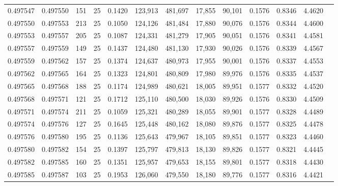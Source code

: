 \begin{tabular}{rrrrrrrrrrrrr}
0.497547 & 0.497550 & 151 &  25 &                                     0.1420 & 123,913 & 481,697 &  17,855 &  90,101 & 0.1576 & 0.8346 & 4.4620 \\
0.497550 & 0.497553 & 213 &  25 &                                     0.1050 & 124,126 & 481,484 &  17,880 &  90,076 & 0.1576 & 0.8344 & 4.4600 \\
0.497553 & 0.497557 & 205 &  25 &                                     0.1087 & 124,331 & 481,279 &  17,905 &  90,051 & 0.1576 & 0.8341 & 4.4581 \\
0.497557 & 0.497559 & 149 &  25 &                                     0.1437 & 124,480 & 481,130 &  17,930 &  90,026 & 0.1576 & 0.8339 & 4.4567 \\
0.497559 & 0.497562 & 157 &  25 &                                     0.1374 & 124,637 & 480,973 &  17,955 &  90,001 & 0.1576 & 0.8337 & 4.4553 \\
0.497562 & 0.497565 & 164 &  25 &                                     0.1323 & 124,801 & 480,809 &  17,980 &  89,976 & 0.1576 & 0.8335 & 4.4537 \\
0.497565 & 0.497568 & 188 &  25 &                                     0.1174 & 124,989 & 480,621 &  18,005 &  89,951 & 0.1577 & 0.8332 & 4.4520 \\
0.497568 & 0.497571 & 121 &  25 &                                     0.1712 & 125,110 & 480,500 &  18,030 &  89,926 & 0.1576 & 0.8330 & 4.4509 \\
0.497571 & 0.497574 & 211 &  25 &                                     0.1059 & 125,321 & 480,289 &  18,055 &  89,901 & 0.1577 & 0.8328 & 4.4489 \\
0.497574 & 0.497576 & 127 &  25 &                                     0.1645 & 125,448 & 480,162 &  18,080 &  89,876 & 0.1577 & 0.8325 & 4.4478 \\
0.497576 & 0.497580 & 195 &  25 &                                     0.1136 & 125,643 & 479,967 &  18,105 &  89,851 & 0.1577 & 0.8323 & 4.4460 \\
0.497580 & 0.497582 & 154 &  25 &                                     0.1397 & 125,797 & 479,813 &  18,130 &  89,826 & 0.1577 & 0.8321 & 4.4445 \\
0.497582 & 0.497585 & 160 &  25 &                                     0.1351 & 125,957 & 479,653 &  18,155 &  89,801 & 0.1577 & 0.8318 & 4.4430 \\
0.497585 & 0.497587 & 103 &  25 &                                     0.1953 & 126,060 & 479,550 &  18,180 &  89,776 & 0.1577 & 0.8316 & 4.4421 \\

\end{tabular}
